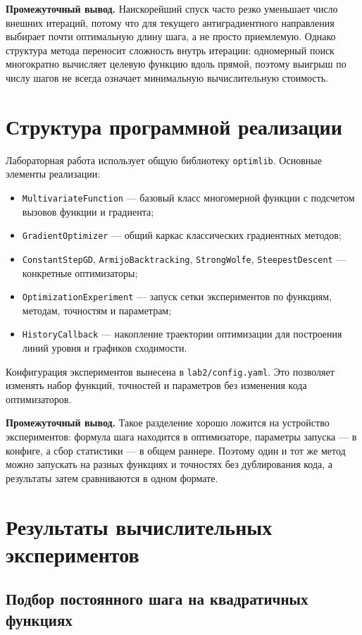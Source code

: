 \documentclass[14pt,a4paper]{extarticle}
\begin{document}
\textbf{Промежуточный вывод.} Наискорейший спуск часто резко уменьшает число внешних итераций, потому что для текущего антиградиентного направления выбирает почти оптимальную длину шага, а не просто приемлемую. Однако структура метода переносит сложность внутрь итерации: одномерный поиск многократно вычисляет целевую функцию вдоль прямой, поэтому выигрыш по числу шагов не всегда означает минимальную вычислительную стоимость.

\section{Структура программной реализации}

Лабораторная работа использует общую библиотеку \texttt{optimlib}. Основные элементы реализации:
\begin{itemize}
    \item \texttt{MultivariateFunction} --- базовый класс многомерной функции с подсчетом вызовов функции и градиента;
    \item \texttt{GradientOptimizer} --- общий каркас классических градиентных методов;
    \item \texttt{ConstantStepGD}, \texttt{ArmijoBacktracking}, \texttt{StrongWolfe}, \texttt{SteepestDescent} --- конкретные оптимизаторы;
    \item \texttt{OptimizationExperiment} --- запуск сетки экспериментов по функциям, методам, точностям и параметрам;
    \item \texttt{HistoryCallback} --- накопление траектории оптимизации для построения линий уровня и графиков сходимости.
\end{itemize}

Конфигурация экспериментов вынесена в \texttt{lab2/config.yaml}. Это позволяет изменять набор функций, точностей и параметров без изменения кода оптимизаторов.

\textbf{Промежуточный вывод.} Такое разделение хорошо ложится на устройство экспериментов: формула шага находится в оптимизаторе, параметры запуска --- в конфиге, а сбор статистики --- в общем раннере. Поэтому один и тот же метод можно запускать на разных функциях и точностях без дублирования кода, а результаты затем сравниваются в одном формате.

\section{Результаты вычислительных экспериментов}

\subsection{Подбор постоянного шага на квадратичных функциях}
\end{document}
